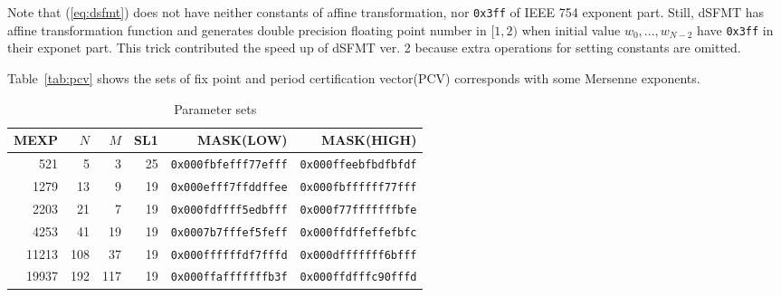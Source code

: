 \documentclass{svmult}
\begin{document}
Note that (\ref{eq:dsfmt}) does not have neither constants of affine
transformation, nor \texttt{0x3ff} of IEEE 754 exponent part.  Still,
dSFMT has affine transformation function and generates double
precision floating point number in $[1, 2)$ when initial value $w_0,
..., w_{N-2}$ have \texttt{0x3ff} in their exponet part. This trick
contributed the speed up of dSFMT ver. 2 because extra operations for
setting constants are omitted.

Table~\ref{tab:pcv} shows the sets of fix point and period
certification vector(PCV) corresponds with some Mersenne exponents.


\begin{table}
  \begin{center}
    \caption{Parameter sets}
    \label{tab:params}
    \begin{tabular}{rrrrrr} \hline
      MEXP & $N$ & $M$ & SL1 & MASK(LOW) & MASK(HIGH) \\ \hline \hline
      521 & 5 & 3 & 25 & \texttt{0x000fbfefff77efff} 
      & \texttt{0x000ffeebfbdfbfdf} \\
      1279 & 13 & 9 & 19 & \texttt{0x000efff7ffddffee} 
      & \texttt{0x000fbffffff77fff} \\
      2203 & 21 & 7 & 19 & \texttt{0x000fdffff5edbfff} 
      & \texttt{0x000f77fffffffbfe} \\
      4253 & 41 & 19 & 19 & \texttt{0x0007b7fffef5feff} 
      & \texttt{0x000ffdffeffefbfc} \\
      11213 & 108 & 37 & 19 & \texttt{0x000ffffffdf7fffd} 
      & \texttt{0x000dfffffff6bfff} \\
      19937 & 192 & 117 & 19 & \texttt{0x000ffafffffffb3f} 
      & \texttt{0x000ffdfffc90fffd} \\ \hline
    \end{tabular}
  \end{center}
\end{table}

\end{document}
